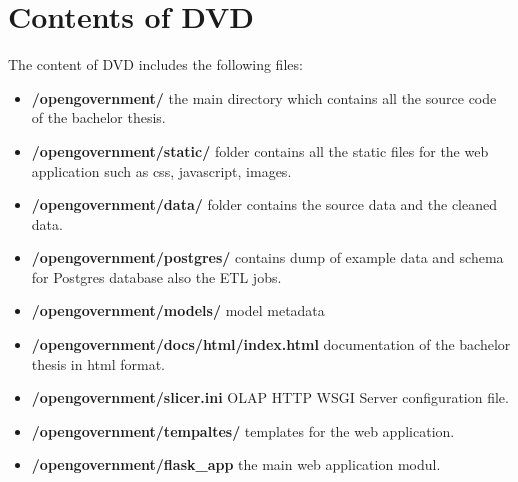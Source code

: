 \documentclass[letterpaper,12pt,oneside]{sphinxmanual}
\begin{document}
\section{Contents of DVD}
\label{appendixb:contents-of-dvd}
The content of DVD includes the following files:
\begin{itemize}
\item {} 
\textbf{/opengovernment/} the main directory which contains all the source code of the bachelor thesis.

\item {} 
\textbf{/opengovernment/static/} folder contains all the static files for the web application such as css, javascript, images.

\item {} 
\textbf{/opengovernment/data/} folder contains the source data and the cleaned data.

\item {} 
\textbf{/opengovernment/postgres/} contains dump of example data and schema for Postgres database also the ETL jobs.

\item {} 
\textbf{/opengovernment/models/} model metadata

\item {} 
\textbf{/opengovernment/docs/html/index.html} documentation of the bachelor thesis in html format.

\item {} 
\textbf{/opengovernment/slicer.ini} OLAP HTTP WSGI Server configuration file.

\item {} 
\textbf{/opengovernment/tempaltes/} templates for the web application.

\item {} 
\textbf{/opengovernment/flask\_app} the main web application modul.

\end{itemize}

\begin{thebibliography}{workspace}
\end{thebibliography}



\renewcommand{\indexname}{Index}
\printindex
\end{document}
